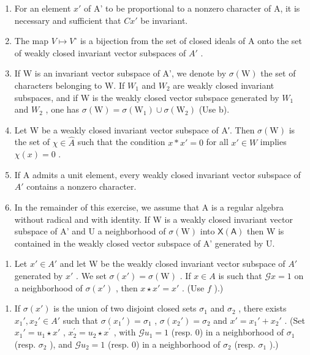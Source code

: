 \begin{enumerate}
\def\labelenumi{\alph{enumi})}
\item
  For an element \(x'\) of A' to be proportional to a nonzero character of A, it is necessary and sufficient that \(Cx'\) be invariant.
\item
  The map \(V \mapsto V^{\circ}\) is a bijection from the set of closed ideals of A onto the set of weakly closed invariant vector subspaces of \(A'\) .
\item
  If W is an invariant vector subspace of A', we denote by \(\sigma(\mathrm{W})\) the set of characters belonging to W. If \(W_{1}\) and \(W_{2}\) are weakly closed invariant subspaces, and if W is the weakly closed vector subspace generated by \(W_{1}\) and \(W_{2}\) , one has \(\sigma(\mathrm{W}) = \sigma(\mathrm{W}_{1}) \cup \sigma(\mathrm{W}_{2})\) (Use b).
\item
  Let W be a weakly closed invariant vector subspace of A′. Then \(\sigma(\mathrm{W})\) is the set of \(\chi \in \widehat{A}\) such that the condition \(x * x' = 0\) for all \(x' \in W\) implies \(\chi(x) = 0\) .
\item
  If A admits a unit element, every weakly closed invariant vector subspace of \(A'\) contains a nonzero character.
\item
  In the remainder of this exercise, we assume that A is a regular algebra without radical and with identity. If W is a weakly closed invariant vector subspace of A' and U a neighborhood of \(\sigma(\mathrm{W})\) into \(\mathsf{X}(\mathsf{A})\) then W is contained in the weakly closed vector subspace of A' generated by U.
\end{enumerate}

\begin{enumerate}
\def\labelenumi{\alph{enumi})}
\setcounter{enumi}{6}
\tightlist
\item
  Let \(x' \in A'\) and let W be the weakly closed invariant vector subspace of \(A'\) generated by \(x'\) . We set \(\sigma(x') = \sigma(\mathrm{W})\) . If \(x \in A\) is such that \(\mathcal{G}x = 1\) on a neighborhood of \(\sigma(x')\) , then \(x \star x' = x'\) . (Use \(f\) ).)
\end{enumerate}

\begin{enumerate}
\def\labelenumi{\alph{enumi})}
\setcounter{enumi}{7}
\tightlist
\item
  If \(\sigma(x')\) is the union of two disjoint closed sets \(\sigma_1\) and \(\sigma_2\) , there exists \(x_1', x_2' \in A'\) such that \(\sigma(x_1') = \sigma_1\) , \(\sigma(x_2') = \sigma_2\) and \(x' = x_1' + x_2'\) . (Set \(x_1' = u_1 \star x'\) , \(x_{2}^{\prime}=u_{2}\star x^{\prime}\) , with \(\mathcal{G}u_{1}=1\) (resp. 0) in a neighborhood of \(\sigma_{1}\) (resp. \(\sigma_{2}\) ), and \(\mathcal{G}u_{2}=1\) (resp. 0) in a neighborhood of \(\sigma_{2}\) (resp. \(\sigma_{1}\) ).)
\end{enumerate}

